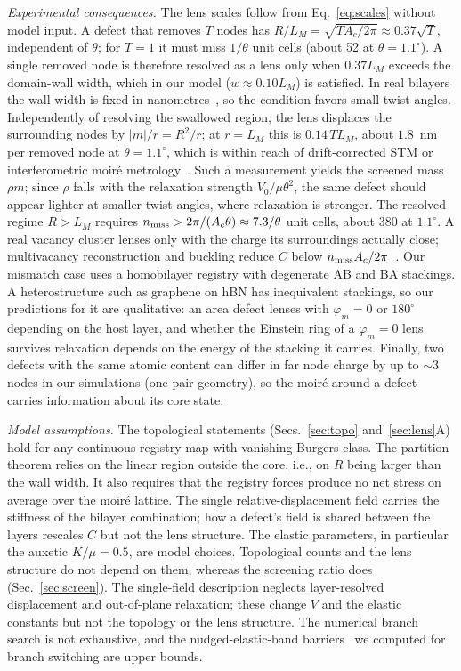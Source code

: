 \documentclass[prb,twocolumn,superscriptaddress,floatfix,10pt]{revtex4-2}
\begin{document}
\emph{Experimental consequences.} The lens scales follow from Eq.~\eqref{eq:scales} without model input. A defect that removes $T$ nodes has $R/L_M=\sqrt{TA_c/2\pi}\approx0.37\sqrt T$, independent of $\theta$; for $T=1$ it must miss $1/\theta$ unit cells (about 52 at $\theta=1.1^\circ$). A single removed node is therefore resolved as a lens only when $0.37L_M$ exceeds the domain-wall width, which in our model ($w\approx0.10L_M$) is satisfied. In real bilayers the wall width is fixed in nanometres~\cite{Alden2013}, so the condition favors small twist angles. Independently of resolving the swallowed region, the lens displaces the surrounding nodes by $|m|/r=R^2/r$; at $r=L_M$ this is $0.14\,T L_M$, about $1.8$~nm per removed node at $\theta=1.1^\circ$, which is within reach of drift-corrected STM or interferometric moir\'e metrology~\cite{Kerelsky2019,Uri2020,Halbertal2021,Kazmierczak2021}. Such a measurement yields the screened mass $\rho m$; since $\rho$ falls with the relaxation strength $V_0/\mu\theta^2$, the same defect should appear lighter at smaller twist angles, where relaxation is stronger. The resolved regime $R>L_M$ requires $n_{\rm miss}>2\pi/(A_c\theta)\approx7.3/\theta$ unit cells, about 380 at $1.1^\circ$. A real vacancy cluster lenses only with the charge its surroundings actually close; multivacancy reconstruction and buckling reduce $C$ below $n_{\rm miss}A_c/2\pi$~\cite{Banhart2011}. Our mismatch case uses a homobilayer registry with degenerate AB and BA stackings. A heterostructure such as graphene on hBN has inequivalent stackings, so our predictions for it are qualitative: an area defect lenses with $\varphi_m=0$ or $180^\circ$ depending on the host layer, and whether the Einstein ring of a $\varphi_m=0$ lens survives relaxation depends on the energy of the stacking it carries. Finally, two defects with the same atomic content can differ in far node charge by up to $\sim3$ nodes in our simulations (one pair geometry), so the moir\'e around a defect carries information about its core state.

\emph{Model assumptions.} The topological statements (Secs.~\ref{sec:topo} and~\ref{sec:lens}A) hold for any continuous registry map with vanishing Burgers class. The partition theorem relies on the linear region outside the core, i.e., on $R$ being larger than the wall width. It also requires that the registry forces produce no net stress on average over the moir\'e lattice. The single relative-displacement field carries the stiffness of the bilayer combination; how a defect's field is shared between the layers rescales $C$ but not the lens structure. The elastic parameters, in particular the auxetic $K/\mu=0.5$, are model choices. Topological counts and the lens structure do not depend on them, whereas the screening ratio does (Sec.~\ref{sec:screen}). The single-field description neglects layer-resolved displacement and out-of-plane relaxation; these change $V$ and the elastic constants but not the topology or the lens structure. The numerical branch search is not exhaustive, and the nudged-elastic-band barriers~\cite{Henkelman2000} we computed for branch switching are upper bounds.
\end{document}
